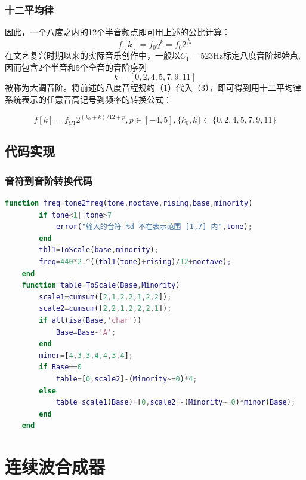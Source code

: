 \documentclass[utf8,10pt]{beamer}
\begin{document}
\begin{frame}
    \frametitle{十二平均律}

    因此，一个八度之内的12个半音频点即可用上述的公比计算：
    \begin{equation}
        f[k]=f_0 q^{k}=f_0 2^{\frac{k}{12}}
    \end{equation}
    在文艺复兴时期以来的实际音乐创作中，一般以\(C_1=523\text{Hz}\)标定八度音阶起始点,因而包含2个半音和5个全音的音阶序列
    \begin{equation}
        k=[0,2,4,5,7,9,11]
    \end{equation}
    被称为大调音阶。将前述的八度音程规约（1）代入（3），即可得到用十二平均律系统表示的任意音高记号到频率的转换公式：

    \begin{equation}
        f[k]=f_{C1}2^{(k_{0}+k)/12+p},p\in[-4,5],\{k_{0},k\}\subset\{0,2,4,5,7,9,11\}
    \end{equation}

\end{frame}

\subsection{代码实现}
\begin{frame}[fragile]
    \frametitle{音符到音阶转换代码}

    \begin{lstlisting}[language=matlab,style=lgeneral,gobble=3]
    function freq=tone2freq(tone,noctave,rising,base,minority)
        if tone<1||tone>7
            error("输入的音符 %d 不在表示范围 [1,7] 内",tone);
        end
        tbl1=ToScale(base,minority);
        freq=440*2.^((tbl1(tone)+rising)/12+noctave);
    end
    function table=ToScale(Base,Minority)
        scale1=cumsum([2,1,2,2,1,2,2]);
        scale2=cumsum([2,2,1,2,2,2,1]);
        if all(isa(Base,'char'))
            Base=Base-'A';
        end
        minor=[4,3,3,4,4,3,4];
        if Base==0
            table=[0,scale2]-(Minority~=0)*4;
        else
            table=scale1(Base)+[0,scale2]-(Minority~=0)*minor(Base);
        end
    end
    \end{lstlisting}

\end{frame}

\section{连续波合成器}
\end{document}
